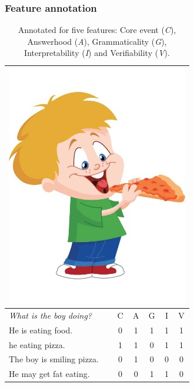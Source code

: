 \documentclass[xcolor={dvipsnames}]{beamer}
\begin{document}
\begin{frame}
\frametitle{Feature annotation}
\begin{table}[htb!]
\small
\begin{center}
\begin{tabular}{|l|c|c|c|c|c|}
\hline
\multicolumn{6}{|c|}{\includegraphics[width=0.25\columnwidth]{figures/I02.jpg}} \\
\hline
\textit{What is the boy doing?} & C & A & G & I & V \\
\hline
\hline
He is eating food. & 0 & 1 & 1 & 1 & 1 \\
\hline
he eating pizza. & 1 & 1 & 0 & 1 & 1 \\
\hline
The boy is smiling pizza. & 0 & 1 & 0 & 0 & 0 \\
\hline
He may get fat eating. & 0 & 0 & 1 & 1 & 0 \\
\hline
\end{tabular}
\caption{\label{tab:dev-transitive} \small Annotated for five features: Core event (\textit{C}), Answerhood (\textit{A}), Grammaticality (\textit{G}), Interpretability (\textit{I}) and Verifiability (\textit{V}).}
\end{center}
\end{table}
\end{frame}
\end{document}
